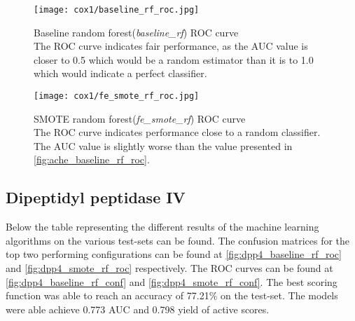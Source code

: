 \begin{figure}[H]
    \begin{center}
        \captionsetup{justification=centering}
        \texttt{[image: cox1/baseline\_rf\_roc.jpg]}
        \caption[]{Baseline random forest(\textit{baseline\_rf}) ROC curve\\
            The ROC curve indicates fair performance, as the AUC value is closer to 0.5 which would be a random estimator than it is to 1.0 which would indicate a perfect classifier.
        }
        \label{fig:cox1_baseline_rf_roc}
    \end{center}

\end{figure}

\begin{figure}[H]
    \begin{center}
        \captionsetup{justification=centering}
        \texttt{[image: cox1/fe\_smote\_rf\_roc.jpg]}
        \caption[]{SMOTE random forest(\textit{fe\_smote\_rf}) ROC curve\\
            The ROC curve indicates performance close to a random classifier. The AUC value is slightly worse than the value presented in \ref*{fig:ache_baseline_rf_roc}.
        }
        \label{fig:cox1_smote_rf_roc}
    \end{center}
\end{figure}

\subsection{Dipeptidyl peptidase IV}
Below the table representing the different results of the machine learning algorithms on the various test-sets can be found.
The confusion matrices for the top two performing configurations can be found at \ref{fig:dpp4_baseline_rf_roc} and \ref{fig:dpp4_smote_rf_roc}
respectively. The ROC curves can be found at \ref{fig:dpp4_baseline_rf_conf} and \ref{fig:dpp4_smote_rf_conf}.
The best scoring function was able to reach an accuracy of 77.21\% on the test-set. The models were able achieve 0.773 AUC and 0.798 yield of active scores.

